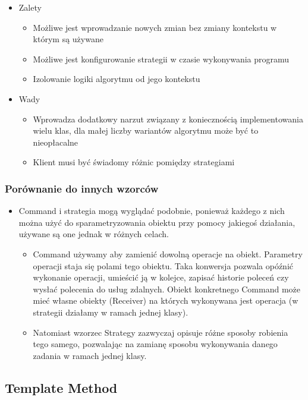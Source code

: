 \documentclass[a4paper,15pt]{article}
\begin{document}
\begin{itemize}
\item Zalety
\begin{itemize}
\item Możliwe jest wprowadzanie nowych zmian bez zmiany kontekstu w którym są używane
\item Możliwe jest konfigurowanie strategii w czasie wykonywania programu
\item Izolowanie logiki algorytmu od jego kontekstu
\end{itemize}
\item Wady
\begin{itemize}
\item Wprowadza dodatkowy narzut związany z koniecznością implementowania wielu klas, dla małej liczby wariantów algorytmu może być to nieopłacalne
\item Klient musi być świadomy różnic pomiędzy strategiami
\end{itemize}
\end{itemize}

\subsubsection{Porównanie do innych wzorców}

\begin{itemize}
\item Command i strategia mogą wyglądać podobnie, ponieważ każdego z nich można użyć do sparametryzowania obiektu przy pomocy jakiegoś działania, używane są one jednak w różnych celach. 

\begin{itemize}
\item Command używamy aby zamienić dowolną operacje na obiekt. Parametry operacji staja się polami tego obiektu. Taka konwersja pozwala opóźnić wykonanie operacji, umieścić ją w kolejce, zapisać historie poleceń czy wysłać polecenia do usług zdalnych. Obiekt konkretnego Command może mieć własne obiekty (Receiver) na których wykonywana jest operacja (w strategii działamy w ramach jednej klasy). 
\item Natomiast wzorzec Strategy zazwyczaj opisuje różne sposoby robienia tego samego, pozwalając na zamianę sposobu wykonywania danego zadania w ramach jednej klasy.
\end{itemize}

\end{itemize}


\newpage
\subsection{Template Method}
\end{document}

